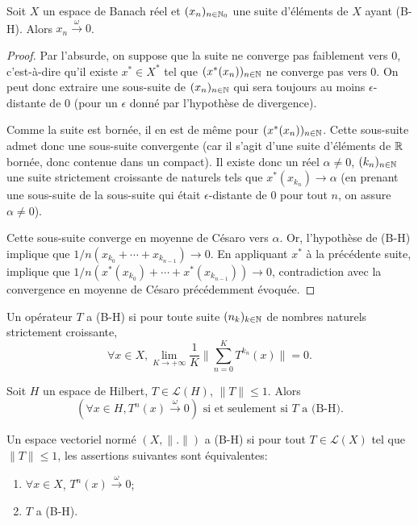 \begin{prop}
  Soit $X$ un espace de Banach réel et $(x_n)_{n\in\mathbb{N}_0}$ une suite
  d'éléments de $X$ ayant (B-H). Alors $x_n\xrightarrow{\omega}0$.
\end{prop}
\begin{proof}
  Par l'absurde, on suppose que la suite ne converge pas faiblement
  vers $0$, c'est-à-dire qu'il existe $x^*\in X^*$ tel que
  $(x^*(x_n))_{n\in\mathbb{N}}$ ne converge pas vers $0$. On peut donc
  extraire une sous-suite de $(x_n)_{n\in\mathbb{N}}$ qui sera toujours au moins
  $\epsilon$-distante de $0$ (pour un $\epsilon$ donné par l'hypothèse de
  divergence).

  Comme la suite est bornée, il en est de même
  pour $(x^*(x_n))_{n\in\mathbb{N}}$. Cette sous-suite admet donc une
  sous-suite convergente (car il s'agit d'une suite d'éléments de $\mathbb{R}$
  bornée, donc contenue dans un compact). Il existe donc un réel $\alpha\neq 0$,
  $(k_n)_{n\in\mathbb{N}}$ une suite strictement croissante de naturels tels que
  $x^*(x_{k_n})\to\alpha$ (en prenant une sous-suite de la sous-suite
  qui était $\epsilon$-distante de 0 pour tout $n$, on assure $\alpha\neq 0$).

  Cette sous-suite converge en moyenne de Césaro vers $\alpha$. Or, l'hypothèse
  de (B-H) implique que $1/n(x_{k_0} + \cdots + x_{k_{n-1}})\to 0$.
  En appliquant $x^*$ à la précédente suite, implique que
  $1/n(x^*(x_{k_0}) + \cdots + x^*(x_{k_{n-1}}))\to 0$, contradiction avec
  la convergence en moyenne de Césaro précédemment évoquée.
\end{proof}

\begin{df}
  Un opérateur $T$ a (B-H) si pour toute suite $(n_k)_{k\in\mathbb{N}}$ de nombres
  naturels strictement croissante,
  $$\forall x\in X,
  \lim_{K\to+\infty}\frac{1}{K}\|\sum_{n=0}^KT^{k_n}(x)\| = 0.$$
\end{df}

\begin{thm} Soit $H$ un espace de Hilbert,
  $T\in\mathcal{L}(H)$, $\|T\|\leq 1$. Alors
  $$(\forall x\in H, T^n(x)\xrightarrow{\omega}0) \mbox{ si et seulement si }
  T \mbox{ a (B-H)}.$$
\end{thm}

\begin{df}
  Un espace vectoriel normé $(X, \|.\|)$ a (B-H) si pour tout
  $T\in\mathcal L(X)$ tel que $\|T\|\leq 1$, les assertions suivantes
  sont équivalentes:
  \begin{enumerate}
  \item $\forall x\in X$, $T^n(x)\xrightarrow{\omega} 0$;
  \item $T$ a (B-H).
  \end{enumerate}
\end{df}

